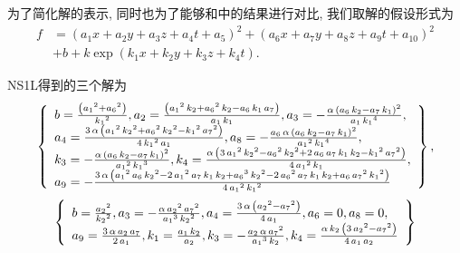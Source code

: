 为了简化解的表示, 同时也为了能够和中的结果进行对比, 我们取解的假设形式为
\begin{equation}
\begin{split}
    f&=(a_1 x+a_2 y+a_3 z+ a_4 t +a_5)^2+(a_6 x+a_7 y+a_8 z+ a_9 t +a_{10})^2 \\
    &+b+k \exp(k_1 x + k_2 y +k_3 z+ k_4 t).
\end{split}
\end{equation}

NS1L得到的三个解为
\begin{eqnarray}
\def\arraystretch{1.2}
\left\{
\begin{array}{l}
b=\frac{\left( {{{a}_{1}}}^{2}+{{{a}_{6}}}^{2}\right) }{{{{k}_{1}}}^{2}},
{{a}_{2}}=\frac{\left( {{{a}_{1}}}^{2}\,{{k}_{2}}+{{{a}_{6}}}^{2}\,{{k}_{2}}-{{a}_{6}}\,{{k}_{1}}\,{{a}_{7}}\right) }{{{a}_{1}}\,{{k}_{1}}},
{{a}_{3}}=-\frac{\alpha\,\left( {{a}_{6}}\,{{k}_{2}}-{{a}_{7}}\,{{k}_{1}}\right) ^{2}}{{{a}_{1}}\,{{{k}_{1}}}^{4}},\\
{{a}_{4}}=\frac{3\,\alpha\,\left( {{{a}_{1}}}^{2}\,{{{k}_{2}}}^{2}+{{{a}_{6}}}^{2}\,{{{k}_{2}}}^{2}-{{{k}_{1}}}^{2}\,{{{a}_{7}}}^{2}\right) }{4\,{{{k}_{1}}}^{2}\,{{a}_{1}}},
{{a}_{8}}=-\frac{{{a}_{6}}\,\alpha\,\left( {{a}_{6}}\,{{k}_{2}}-{{a}_{7}}\,{{k}_{1}}\right) ^{2}}{{{{a}_{1}}}^{2}\,{{{k}_{1}}}^{4}},\\
{{k}_{3}}=-\frac{\alpha\,\left( {{a}_{6}}\,{{k}_{2}}-{{a}_{7}}\,{{k}_{1}}\right) ^{2}}{{{{a}_{1}}}^{2}\,{{{k}_{1}}}^{3}},
{{k}_{4}}=\frac{\alpha\,\left( 3\,{{{a}_{1}}}^{2}\,{{{k}_{2}}}^{2}-{{{a}_{6}}}^{2}\,{{{k}_{2}}}^{2}+2\,{{a}_{6}}\,{{a}_{7}}\,{{k}_{1}}\,{{k}_{2}}-{{{k}_{1}}}^{2}\,{{{a}_{7}}}^{2}\right) }{4\,{{{a}_{1}}}^{2}\,{{k}_{1}}},\\
{{a}_{9}}=-\frac{3\,\alpha\,\left( {{{a}_{1}}}^{2}\,{{a}_{6}}\,{{{k}_{2}}}^{2}-2\,{{{a}_{1}}}^{2}\,{{a}_{7}}\,{{k}_{1}}\,{{k}_{2}}+{{{a}_{6}}}^{3}\,{{{k}_{2}}}^{2}-2\,{{{a}_{6}}}^{2}\,{{a}_{7}}\,{{k}_{1}}\,{{k}_{2}}+{{a}_{6}}\,{{{a}_{7}}}^{2}\,{{{k}_{1}}}^{2}\right) }{4\,{{{a}_{1}}}^{2}\,{{{k}_{1}}}^{2}}\\
\end{array}
\right\}, \label{1S1L-1}
\end{eqnarray}
\begin{equation}
\def\arraystretch{1.2}
\left\{
\begin{array}{l}  
b=\frac{{{{a}_{2}}}^{2}}{{{{k}_{2}}}^{2}},
{{a}_{3}}=-\frac{\alpha\,{{{a}_{2}}}^{2}\,{{{a}_{7}}}^{2}}{{{{a}_{1}}}^{3}\,{{{k}_{2}}}^{2}},
{{a}_{4}}=\frac{3\,\alpha\,\left( {{{a}_{2}}}^{2}-{{{a}_{7}}}^{2}\right) }{4\,{{a}_{1}}},
{{a}_{6}}=0,
{{a}_{8}}=0,\\
{{a}_{9}}=\frac{3\,\alpha\,{{a}_{2}}\,{{a}_{7}}}{2\,{{a}_{1}}},
{{k}_{1}}=\frac{{{a}_{1}}\,{{k}_{2}}}{{{a}_{2}}},
{{k}_{3}}=-\frac{{{a}_{2}}\,\alpha\,{{{a}_{7}}}^{2}}{{{{a}_{1}}}^{3}\,{{k}_{2}}},
{{k}_{4}}=\frac{\alpha\,{{k}_{2}}\,\left( 3\,{{{a}_{2}}}^{2}-{{{a}_{7}}}^{2}\right) }{4\,{{a}_{1}}\,{{a}_{2}}}
\end{array}
\right\} \label{1S1L-2}
\end{equation}
